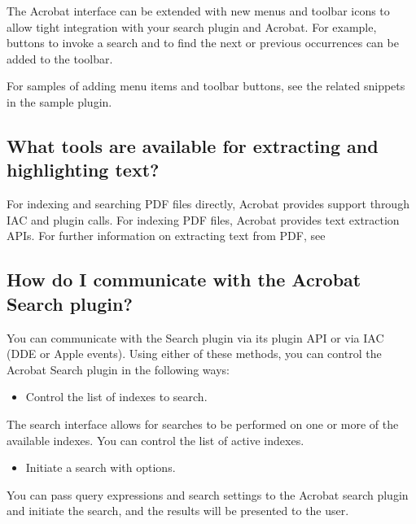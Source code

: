 \documentclass[letterpaper,12pt,english,openany,oneside]{sphinxmanual}
\begin{document}
The Acrobat interface can be extended with new menus and toolbar icons to allow tight integration with your search plug\sphinxhyphen{}in and Acrobat. For example, buttons to invoke a search and to find the next or previous occurrences can be added to the toolbar.

For samples of adding menu items and toolbar buttons, see the related snippets in the  sample plug\sphinxhyphen{}in.




\subsection{What tools are available for extracting and highlighting text?}
\label{\detokenize{apxDevFAQ:what-tools-are-available-for-extracting-and-highlighting-text}}
For indexing and searching PDF files directly, Acrobat provides support through IAC and plug\sphinxhyphen{}in calls. For indexing PDF files, Acrobat provides text extraction APIs. For further information on extracting text from PDF, see 


\subsection{How do I communicate with the Acrobat Search plug\sphinxhyphen{}in?}
\label{\detokenize{apxDevFAQ:how-do-i-communicate-with-the-acrobat-search-plug-in}}
You can communicate with the Search plug\sphinxhyphen{}in via its plug\sphinxhyphen{}in API or via IAC (DDE or Apple events). Using either of these methods, you can control the Acrobat Search plug\sphinxhyphen{}in in the following ways:
\begin{itemize}
\item {} 
Control the list of indexes to search.

\end{itemize}

The search interface allows for searches to be performed on one or more of the available indexes. You can control the list of active indexes.
\begin{itemize}
\item {} 
Initiate a search with options.

\end{itemize}

You can pass query expressions and search settings to the Acrobat search plug\sphinxhyphen{}in and initiate the search, and the results will be presented to the user.
\end{document}
